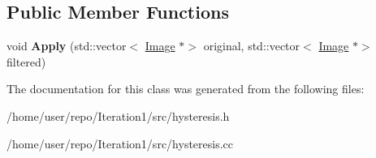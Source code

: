 \subsection*{Public Member Functions}
\begin{DoxyCompactItemize}
\item 
\mbox{\label{classHysteresisFilter_af2d6c50bc0cfd609fbf7e90f01b03b1f}} 
void {\bfseries Apply} (std\+::vector$<$ \hyperlink{classImage}{Image} $\ast$$>$ original, std\+::vector$<$ \hyperlink{classImage}{Image} $\ast$$>$ filtered)
\end{DoxyCompactItemize}


The documentation for this class was generated from the following files\+:\begin{DoxyCompactItemize}
\item 
/home/user/repo/\+Iteration1/src/hysteresis.\+h\item 
/home/user/repo/\+Iteration1/src/hysteresis.\+cc\end{DoxyCompactItemize}
